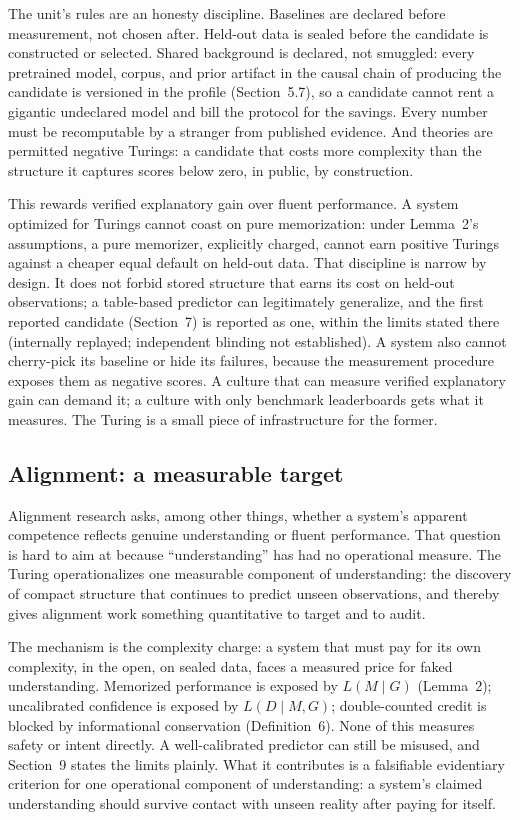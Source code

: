 \documentclass[11pt]{article}
\begin{document}
The unit's rules are an honesty discipline. Baselines are declared before measurement, not chosen after. Held-out data is sealed before the candidate is constructed or selected. Shared background is declared, not smuggled: every pretrained model, corpus, and prior artifact in the causal chain of producing the candidate is versioned in the profile (Section~5.7), so a candidate cannot rent a gigantic undeclared model and bill the protocol for the savings. Every number must be recomputable by a stranger from published evidence. And theories are permitted negative Turings: a candidate that costs more complexity than the structure it captures scores below zero, in public, by construction.

This rewards verified explanatory gain over fluent performance. A system optimized for Turings cannot coast on pure memorization: under Lemma~2's assumptions, a pure memorizer, explicitly charged, cannot earn positive Turings against a cheaper equal default on held-out data. That discipline is narrow by design. It does not forbid stored structure that earns its cost on held-out observations; a table-based predictor can legitimately generalize, and the first reported candidate (Section~7) is reported as one, within the limits stated there (internally replayed; independent blinding not established). A system also cannot cherry-pick its baseline or hide its failures, because the measurement procedure exposes them as negative scores. A culture that can measure verified explanatory gain can demand it; a culture with only benchmark leaderboards gets what it measures. The Turing is a small piece of infrastructure for the former.

\subsection{Alignment: a measurable target}

Alignment research asks, among other things, whether a system's apparent competence reflects genuine understanding or fluent performance. That question is hard to aim at because ``understanding'' has had no operational measure. The Turing operationalizes one measurable component of understanding: the discovery of compact structure that continues to predict unseen observations, and thereby gives alignment work something quantitative to target and to audit.

The mechanism is the complexity charge: a system that must pay for its own complexity, in the open, on sealed data, faces a measured price for faked understanding. Memorized performance is exposed by \(L(M\mid G)\) (Lemma~2); uncalibrated confidence is exposed by \(L(D\mid M,G)\); double-counted credit is blocked by informational conservation (Definition~6). None of this measures safety or intent directly. A well-calibrated predictor can still be misused, and Section~9 states the limits plainly. What it contributes is a falsifiable evidentiary criterion for one operational component of understanding: a system's claimed understanding should survive contact with unseen reality after paying for itself.
\end{document}
